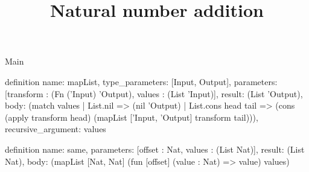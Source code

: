 \begin{lexlean}{Main}
\title{Natural number addition}
\begin{semanticmodule}
definition{
  name: mapList,
  type_parameters: [Input, Output],
  parameters: [transform : (Fn ('Input) 'Output), values : (List 'Input)],
  result: (List 'Output),
  body: (match values
    | List.nil => (nil 'Output)
    | List.cons head tail => (cons (apply transform head) (mapList ['Input, 'Output] transform tail))),
  recursive_argument: values
}

definition{
  name: same,
  parameters: [offset : Nat, values : (List Nat)],
  result: (List Nat),
  body: (mapList [Nat, Nat] (fun [offset] (value : Nat) => value) values)
}
\end{semanticmodule}
\end{lexlean}
